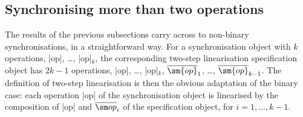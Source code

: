


\subsection{Synchronising more than two operations}
\label{ssec:relating-variations}

The results of the previous subsections carry across to non-binary
synchronisations, in a straightforward way.  For a synchronisation object with
$k$ operations, |op|, \ldots, |op|$_k$, the corresponding two-step
linearisation specification object has $2k-1$ operations, |op|, \ldots,
|op|$_k$, $\overline{\sm{op}}_1$, \ldots, $\overline{\sm{op}}_{k-1}$.  The
definition of two-step linearisation is then the obvious adaptation of the
binary case: each operation |op| of the synchronisation object is
linearised by the composition of |op| and $\overline{\op}_i$ of the
specification object, for $i = 1, \ldots, k-1$.


